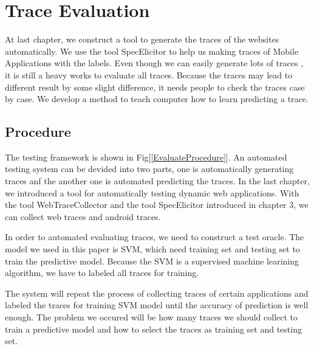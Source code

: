 
\chapter{Trace Evaluation}\label{ch:traceEvaluation}

At last chapter, we construct a tool to generate the traces of the websites automatically.
We use the tool SpecElicitor to help us making traces of Mobile Applications with the labels.
Even though we can easily generate lots of traces ,
it is still a heavy works to evaluate all traces.
Because the traces may lead to different result by some slight difference,
it needs people to check the traces case by case.
We develop a method to teach computer how to learn predicting a trace.


\section{Procedure}

The testing framework is shown in Fig[\ref{EvaluateProcedure}].
An automated testing system can be devided into two parts,
one is automatically generating traces anf the another one is automated predicting the traces.
In the last chapter, we introduced a tool for automatically testing dynamic web applications.
With the tool WebTraceCollector and the tool SpecElicitor introduced in chapter 3,
we can collect web traces and android traces.

In order to automated evaluating traces,
we need to construct a test oracle.
The model we used in this paper is SVM,
which need training set and testing set to train the predictive model.
Because the SVM is a supervised machine learining algorithm,
we have to labeled all traces for training.

The system will repeat the process of collecting traces of certain applications
and labeled the traces for training SVM model
until the accuracy of prediction is well enough.
The problem we occured will be how many traces we should collect to train a predictive model and
how to select the traces as training set and testing set.




